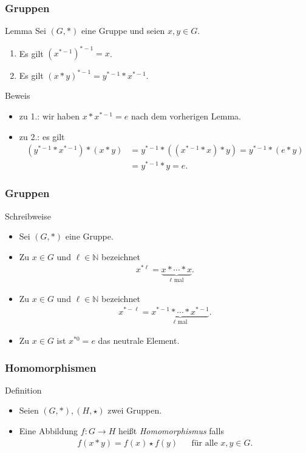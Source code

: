 \documentclass{beamer}
\renewcommand{\emph}[1]{{\textcolor{solarizedRed}{\itshape #1}}}
\newcommand\NN{\mathbb N}
\newcommand{\ue}{\"u}
\begin{document}
\begin{frame}\frametitle{Gruppen}
	\begin{block}{Lemma}
		Sei $(G,*)$ eine Gruppe und seien $x,y\in G$.
		\begin{enumerate}
			\item Es gilt $(x^{*-1})^{*-1}=x$.
			\item Es gilt $(x*y)^{*-1}=y^{*-1}*x^{*-1}$.
		\end{enumerate}
	\end{block}
	\begin{block}{Beweis}
		\begin{itemize}
			\item \alert{zu 1.:} wir haben $x*x^{*-1}=e$ nach dem vorherigen Lemma.
			\item \alert{zu 2.:} es gilt
				\begin{align*}
					(y^{*-1}*x^{*-1})*(x*y)&=y^{*-1}*((x^{*-1}*x)*y)=y^{*-1}*(e*y)\\&=y^{*-1}*y=e.
				\end{align*} 
		\end{itemize}
	\end{block}
\end{frame}

\begin{frame}\frametitle{Gruppen}
	\begin{block}{Schreibweise}
		\begin{itemize}
			\item Sei $(G,*)$ eine Gruppe.
			\item Zu $x\in G$ und $\ell\in\NN$ bezeichnet
				\begin{align*}
					x^{*\ell}=\underbrace{x*\cdots*x}_{\mbox{$\ell$ mal}}.
				\end{align*}
			\item Zu $x\in G$ und $\ell\in\NN$ bezeichnet
				\begin{align*}
					x^{*-\ell}=\underbrace{x^{*-1}*\cdots*x^{*-1}}_{\mbox{$\ell$ mal}}.
				\end{align*}
			\item Zu $x\in G$ ist $x^{*0}=e$ das neutrale Element.
		\end{itemize}
	\end{block}
\end{frame}


\begin{frame}\frametitle{Homomorphismen}
	\begin{block}{Definition}
		\begin{itemize}
			\item Seien $(G,*),(H,\star)$ zwei Gruppen.
			\item Eine Abbildung $f:G\to H$ hei\ss t \emph{Homomorphismus} falls 
				\begin{align*}
					f(x*y)=f(x)\star f(y)&&\mbox{f\ue r alle }x,y\in G.
				\end{align*}
		\end{itemize}
	\end{block}
\end{frame}
\end{document}
